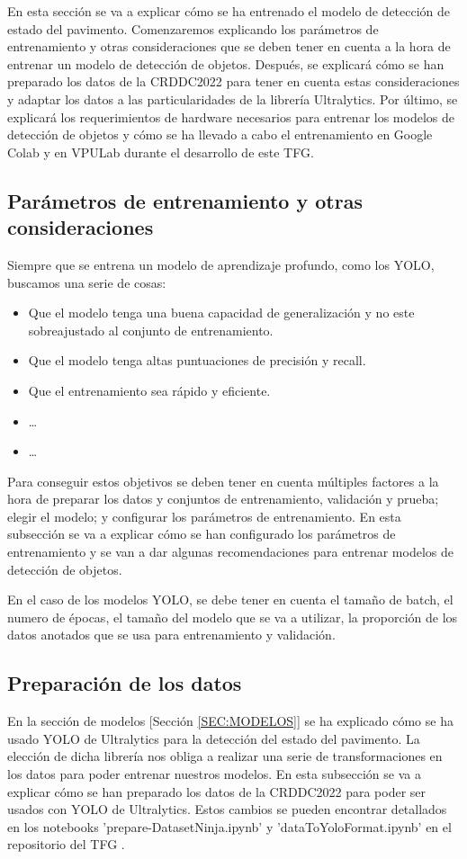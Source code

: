 En esta sección se va a explicar cómo se ha entrenado el modelo de detección de estado del pavimento. Comenzaremos explicando los parámetros de entrenamiento y otras consideraciones que se deben tener en cuenta a la hora de entrenar un modelo de detección de objetos. Después, se explicará cómo se han preparado los datos de la CRDDC2022 para tener en cuenta estas consideraciones y adaptar los datos a las particularidades de la librería Ultralytics. Por último, se explicará los requerimientos de hardware necesarios para entrenar los modelos de detección de objetos y cómo se ha llevado a cabo el entrenamiento en Google Colab y en VPULab durante el desarrollo de este TFG.

\subsection{Parámetros de entrenamiento y otras consideraciones}
Siempre que se entrena un modelo de aprendizaje profundo, como los YOLO, buscamos una serie de cosas:
\begin{itemize}
    \item Que el modelo tenga una buena capacidad de generalización y no este sobreajustado al conjunto de entrenamiento.
    \item Que el modelo tenga altas puntuaciones de precisión y recall.
    \item Que el entrenamiento sea rápido y eficiente.
    \item \dots
    \item \dots
\end{itemize}
Para conseguir estos objetivos se deben tener en cuenta múltiples factores a la hora de preparar los datos y conjuntos de entrenamiento, validación y prueba; elegir el modelo; y configurar los parámetros de entrenamiento. En esta subsección se va a explicar cómo se han configurado los parámetros de entrenamiento y se van a dar algunas recomendaciones para entrenar modelos de detección de objetos.

En el caso de los modelos YOLO, se debe tener en cuenta el tamaño de batch, el numero de épocas, el tamaño del modelo que se va a utilizar, la proporción de los datos anotados que se usa para entrenamiento y validación.

\subsection{Preparación de los datos}
En la sección de modelos [Sección \ref{SEC:MODELOS}] se ha explicado cómo se ha usado YOLO de Ultralytics para la detección del estado del pavimento. La elección de dicha librería nos obliga a realizar una serie de transformaciones en los datos para poder entrenar nuestros modelos. En esta subsección se va a explicar cómo se han preparado los datos de la CRDDC2022 para poder ser usados con YOLO de Ultralytics. Estos cambios se pueden encontrar detallados en los notebooks 'prepare-DatasetNinja.ipynb' y 'dataToYoloFormat.ipynb' en el repositorio del TFG \cite{TFG_Repository}.

